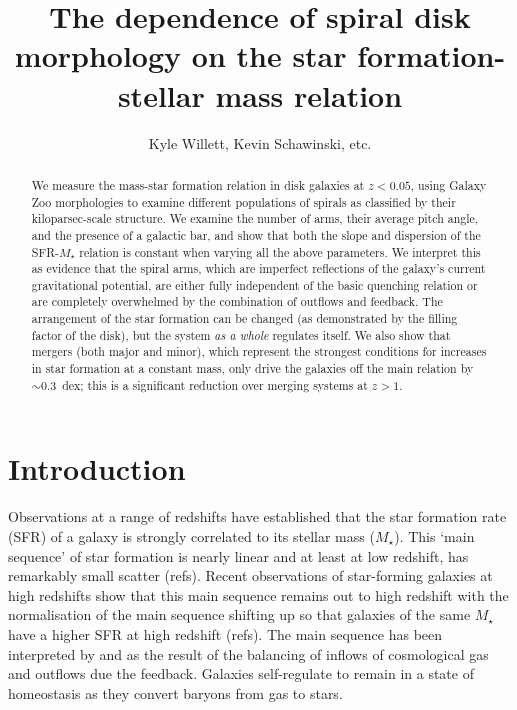 \documentclass{emulateapj}
\begin{document}
\title{The dependence of spiral disk morphology on the star formation-stellar mass relation}

\author{Kyle Willett, Kevin Schawinski, etc.}




\begin{abstract}
We measure the mass-star formation relation in disk galaxies at $z<0.05$, using Galaxy Zoo morphologies to examine different populations of spirals as classified by their kiloparsec-scale structure. We examine the number of arms, their average pitch angle, and the presence of a galactic bar, and show that both the slope and dispersion of the SFR-$M_\star$ relation is constant when varying all the above parameters. We interpret this as evidence that the spiral arms, which are imperfect reflections of the galaxy's current gravitational potential, are either fully independent of the basic quenching relation or are completely overwhelmed by the combination of outflows and feedback. The arrangement of the star formation can be changed (as demonstrated by the filling factor of the disk), but the system \emph{as a whole} regulates itself. We also show that mergers (both major and minor), which represent the strongest conditions for increases in star formation at a constant mass, only drive the galaxies off the main relation by $\sim0.3$~dex; this is a significant reduction over merging systems at $z>1$. 
\end{abstract}



\section{Introduction} \label{sec-intro}

Observations at a range of redshifts have established that the star formation rate (SFR) of a galaxy is strongly correlated to its stellar mass ($M_\star$). This `main sequence' of star formation is nearly linear and at least at low redshift, has remarkably small scatter (refs). Recent observations of star-forming galaxies at high redshifts show that this main sequence remains out to high redshift with the normalisation of the main sequence shifting up so that galaxies of the same $M_\star$ have a higher SFR at high redshift (refs). The main sequence has been interpreted by \citet{bou10} and \citet{lil13} as the result of the balancing of inflows of cosmological gas and outflows due the feedback. Galaxies self-regulate to remain in a state of homeostasis as they convert baryons from gas to stars. 
\end{document}
